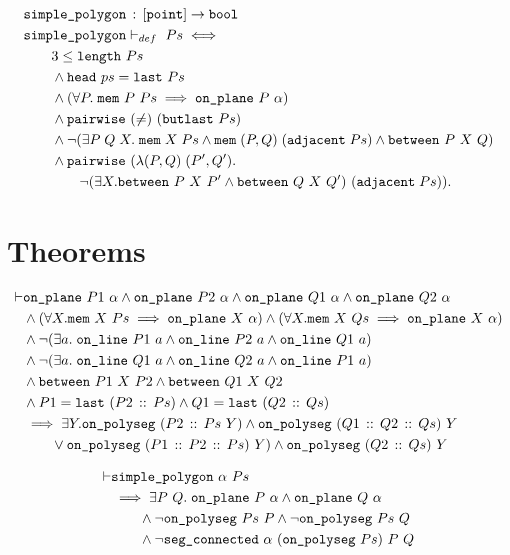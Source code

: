 \begin{align*}
  &\texttt{simple\_polygon}\,:\,[\texttt{point}] \rightarrow \texttt{bool}\\
  &\texttt{simple\_polygon}\vdash_{def}\ Ps \iff \\
  &\qquad 3 \leq \texttt{length}\ Ps\\
  &\qquad\wedge \texttt{head}\ ps = \texttt{last}\ Ps\\
  &\qquad\wedge (\forall P.\;\texttt{mem}\ P\ Ps \implies \texttt{on\_plane}\ P\ \alpha)\\
  &\qquad\wedge \texttt{pairwise}\ (\neq)\ (\texttt{butlast}\ Ps)\\
  &\qquad\wedge \neg(\exists P\;Q\;X.\; \texttt{mem}\;X\;Ps\wedge\texttt{mem}\;(P,Q)\;(\texttt{adjacent}\;Ps)\wedge\texttt{between}\ P\ X\ Q)\\
  &\qquad\wedge \texttt{pairwise}\ (\lambda(P,Q)\;(P',Q').\\
  &\qquad\qquad\neg(\exists X. \texttt{between}\ P\ X\ P' \wedge \texttt{between}\ Q\ X\ Q')\ (\texttt{adjacent}\;Ps)).
\end{align*}

\section{Theorems}
\begin{align*}
\vdash &\code{on\_plane}\ P1\ \alpha \wedge \code{on\_plane}\ P2\ \alpha \wedge \code{on\_plane}\ Q1\ \alpha \wedge \code{on\_plane}\ Q2\ \alpha\\
       &\wedge(\forall X. \code{mem}\ X\ Ps \implies \code{on\_plane}\ X\ \alpha) \wedge (\forall X. \code{mem}\ X\ Qs \implies \code{on\_plane}\ X\ \alpha)\\
       &\wedge\Triangle{a}{P1}{P2}{Q1}\\
       &\wedge\Triangle{a}{Q1}{Q2}{P1}\\
       &\wedge\code{between}\ P1\ X\ P2 \wedge \code{between}\ Q1\ X\ Q2\\
       &\wedge P1 = \code{last}\ (\cons{P2}{Ps}) \wedge Q1 = \code{last}\ (\cons{Q2}{Qs})\\
       &\implies \exists Y. \code{on\_polyseg}\ (\cons{P2}{Ps}\ Y) \wedge \code{on\_polyseg}\ (\cons{Q1}{\cons{Q2}{Qs}})\ Y\\
       &\qquad\vee \code{on\_polyseg}\ (\cons{P1}{\cons{P2}{Ps}})\ Y) \wedge \code{on\_polyseg}\ (\cons{Q2}{Qs})\ Y
\end{align*}

\begin{align*}
\vdash &\code{simple\_polygon}\ \alpha\ Ps\\
       &\implies \exists P\ Q.\; \code{on\_plane}\ P\ \alpha \wedge \code{on\_plane}\ Q\ \alpha\\
       &\qquad\wedge \neg\code{on\_polyseg}\ Ps\ P \wedge \neg\code{on\_polyseg}\ Ps\ Q\\
       &\qquad\wedge \neg\code{seg\_connected}\ \alpha\ (\code{on\_polyseg}\ Ps)\ P\ Q
\end{align*}

